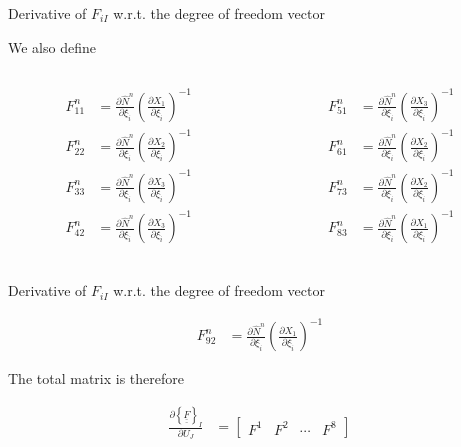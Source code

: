 \documentclass[11pt]{beamer}
\newcommand{\TEN}[1]{\underline{\underline{#1}}}
\begin{document}
\begin{frame}{Derivative of $F_{iI}$ w.r.t. the degree of freedom vector}

We also define
\begin{columns}
\begin{column}{0.5\textwidth}
\begin{align*}
F_{11}^n &= \frac{\partial \hat{N}^n}{\partial \xi_{\hat{i}}} \left(\frac{\partial X_1}{\partial \xi_{\hat{i}}}\right)^{-1}\\
F_{22}^n &= \frac{\partial \hat{N}^n}{\partial \xi_{\hat{i}}} \left(\frac{\partial X_2}{\partial \xi_{\hat{i}}}\right)^{-1}\\
F_{33}^n &= \frac{\partial \hat{N}^n}{\partial \xi_{\hat{i}}} \left(\frac{\partial X_3}{\partial \xi_{\hat{i}}}\right)^{-1}\\
F_{42}^n &= \frac{\partial \hat{N}^n}{\partial \xi_{\hat{i}}} \left(\frac{\partial X_3}{\partial \xi_{\hat{i}}}\right)^{-1}\\
\end{align*}
\end{column}
\begin{column}{0.5\textwidth}
\begin{align*}
F_{51}^n &= \frac{\partial \hat{N}^n}{\partial \xi_{\hat{i}}} \left(\frac{\partial X_3}{\partial \xi_{\hat{i}}}\right)^{-1}\\
F_{61}^n &= \frac{\partial \hat{N}^n}{\partial \xi_{\hat{i}}} \left(\frac{\partial X_2}{\partial \xi_{\hat{i}}}\right)^{-1}\\
F_{73}^n &= \frac{\partial \hat{N}^n}{\partial \xi_{\hat{i}}} \left(\frac{\partial X_2}{\partial \xi_{\hat{i}}}\right)^{-1}\\
F_{83}^n &= \frac{\partial \hat{N}^n}{\partial \xi_{\hat{i}}} \left(\frac{\partial X_1}{\partial \xi_{\hat{i}}}\right)^{-1}\\
\end{align*}
\end{column}
\end{columns}

\end{frame}

\begin{frame}{Derivative of $F_{iI}$ w.r.t. the degree of freedom vector}

\begin{align*}
F_{92}^n &= \frac{\partial \hat{N}^n}{\partial \xi_{\hat{i}}} \left(\frac{\partial X_1}{\partial \xi_{\hat{i}}}\right)^{-1}
\end{align*}

The total matrix is therefore

\begin{align*}
\frac{\partial \left\{\TEN{F}\right\}_I}{\partial U_J} &= \left[\begin{array}{cccc}
F^1 & F^2 & \cdots & F^8
\end{array}\right]
\end{align*}

\end{frame}
\end{document}
